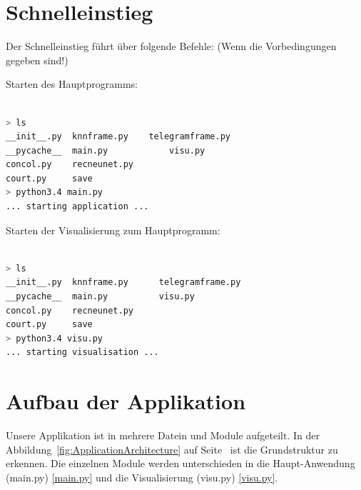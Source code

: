 \documentclass[12pt,twoside]{article}
\theoremstyle{plain}
\theoremstyle{definition}
\theoremstyle{remark}
\begin{document}
 

\section{Schnelleinstieg}

Der Schnelleinstieg führt über folgende Befehle: (Wenn die Vorbedingungen gegeben sind!)


Starten des Hauptprogramms: 
\begin{lstlisting}[frame=single,language=bash]  % Start your code-block

> ls
__init__.py	 knnframe.py 	telegramframe.py
__pycache__	 main.py		    visu.py
concol.py	 recneunet.py
court.py	 save
> python3.4 main.py 
... starting application ...
\end{lstlisting}

Starten der Visualisierung zum Hauptprogramm:
\begin{lstlisting}[frame=single,language=bash]  % Start your code-block

> ls
__init__.py	 knnframe.py	  telegramframe.py
__pycache__	 main.py		  visu.py
concol.py	 recneunet.py
court.py	 save
> python3.4 visu.py 
... starting visualisation ...
\end{lstlisting}


\section{Aufbau der Applikation}

Unsere Applikation ist in mehrere Datein und Module aufgeteilt. In der Abbildung~\ref{fig:ApplicationArchitecture} auf Seite~\pageref{fig:ApplicationArchitecture} ist die Grundstruktur zu erkennen. Die einzelnen Module werden unterschieden in die Haupt-Anwendung (main.py) \ref{main.py} und die Visualisierung (visu.py) \ref{visu.py}.  
\end{document}
